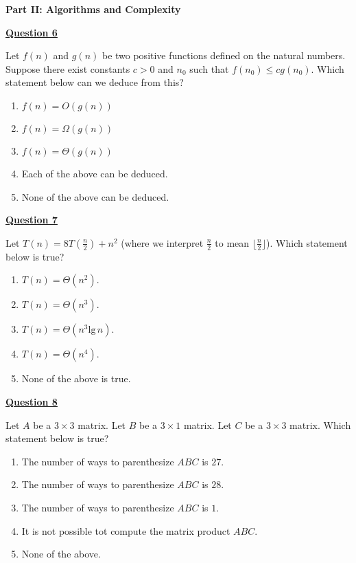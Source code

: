 \documentclass[10pt]{article}
\begin{document}
\bigskip
\begin{center}
{\large \bf Part II: Algorithms and Complexity}
\end{center}

\bigskip
\noindent 
{\bf \underline{Question 6}}

\bigskip 
\noindent
Let $f(n)$ and $g(n)$ be two positive functions defined on the
natural numbers. Suppose there exist constants $c>0$ and $n_0$ such
that $f(n_0) \leq cg(n_0)$. Which statement below can we deduce from
this?

\begin{enumerate}[{\bf (A)}]
\addtolength{\itemsep}{-5pt}
\item $f(n)=O(g(n))$
\item $f(n)=\Omega(g(n))$
\item $f(n)=\Theta(g(n))$
\item Each of the above can be deduced.
\item None of the above can be deduced.
\end{enumerate}

\bigskip
\noindent 
{\bf \underline{Question 7}}

\bigskip 
\noindent
Let $T(n)=8T(\frac{n}{2})+n^2$ (where we interpret $\frac{n}{2}$ to
mean $\lfloor \frac{n}{2}\rfloor$). Which statement below is true?

\begin{enumerate}[{\bf (A)}]
\addtolength{\itemsep}{-5pt}
\item $T(n)=\Theta(n^2)$.
\item $T(n)=\Theta(n^3)$.
\item $T(n)=\Theta(n^3\mbox{lg}\,n)$.
\item $T(n)=\Theta(n^4)$.
\item None of the above is true.
\end{enumerate}

\newpage
\noindent
{\bf \underline{Question 8}}

\bigskip
\noindent
Let $A$ be a $3\times 3$ matrix. Let $B$ be a $3\times 1$ matrix. Let $C$ be a $3\times 3$ matrix.
Which statement below is true?
\begin{enumerate}[{\bf (A)}]
\addtolength{\itemsep}{-5pt}
\item The number of ways to parenthesize $ABC$ is $27$.
\item The number of ways to parenthesize $ABC$ is $28$.
\item The number of ways to parenthesize $ABC$ is $1$.
\item It is not possible tot compute the matrix product $ABC$. 
\item None of the above.
\end{enumerate}
\end{document}
